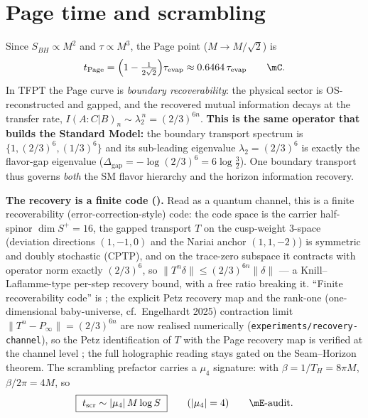 \section{Page time and scrambling}
Since $S_{BH}\propto M^2$ and $\tau\propto M^3$, the Page point ($M\to M/\sqrt2$) is
\[
  t_{\mathrm{Page}}=\Bigl(1-\tfrac1{2\sqrt2}\Bigr)\tau_{\mathrm{evap}}\approx0.6464\,\tau_{\mathrm{evap}}\qquad\mC.
\]
In TFPT the Page curve is \emph{boundary recoverability}: the physical sector is OS-reconstructed and
gapped, and the recovered mutual information decays at the transfer rate,
$I(A{:}C|B)_n\sim\lambda_2^{\,n}=(2/3)^{6n}$. \textbf{This is the same operator that builds the Standard
Model:} the boundary transport spectrum is $\{1,(2/3)^6,(1/3)^6\}$ and its sub-leading eigenvalue
$\lambda_2=(2/3)^6$ is exactly the flavor-gap eigenvalue ($\Delta_{\mathrm{gap}}=-\log(2/3)^6=6\log\tfrac32$).
One boundary transport thus governs \emph{both} the SM flavor hierarchy and the horizon information recovery.
\mE\ 
\par\smallskip
\noindent\textbf{The recovery is a finite code ().} Read as a quantum channel,
this is a finite recoverability (error-correction-style) code: the code space is the carrier half-spinor
$\dim S^+=16$, the gapped transport $T$ on the cusp-weight $3$-space (deviation directions $(1,{-}1,0)$ and
the Nariai anchor $(1,1,{-}2)$) is symmetric and doubly stochastic (CPTP), and on the trace-zero subspace it
contracts with operator norm exactly $(2/3)^6$, so $\|T^n\delta\|\le(2/3)^{6n}\|\delta\|$ --- a
Knill--Laflamme-type per-step recovery bound, with a free ratio breaking it. ``Finite recoverability code''
is \mE; the explicit Petz recovery map and the rank-one (one-dimensional baby-universe, cf.\ Engelhardt
2025) contraction limit $\|T^n-P_\infty\|=(2/3)^{6n}$ are now realised numerically
(\texttt{experiments/recovery-channel}), so the Petz identification of $T$ with the Page recovery map is
verified at the channel level \mC; the full holographic reading stays gated on the Seam--Horizon theorem. The scrambling prefactor carries a $\mu_4$ signature: with
$\beta=1/T_H=8\pi M$, $\beta/2\pi=4M$, so
\[
  \boxed{\ t_{\mathrm{scr}}\sim|\mu_4|\,M\log S\ }\qquad(|\mu_4|=4)\qquad\mE\text{-audit}.
\]

